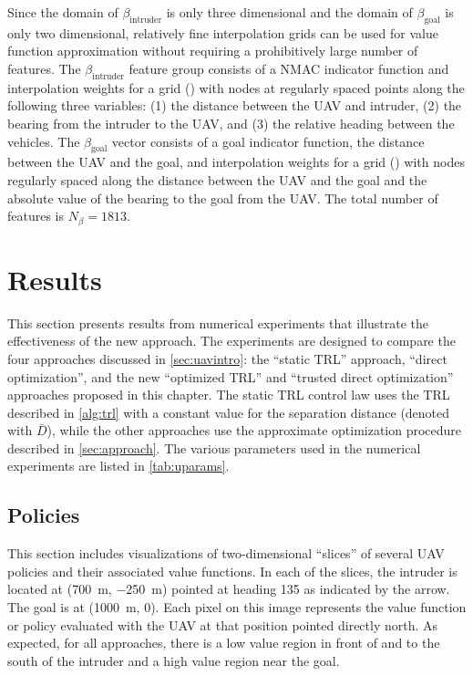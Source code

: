 Since the domain of $\beta_\text{intruder}$ is only three dimensional and the domain of $\beta_\text{goal}$ is only two dimensional, relatively fine interpolation grids can be used for value function approximation without requiring a prohibitively large number of features. The $\beta_\text{intruder}$ feature group consists of a NMAC indicator function and interpolation weights for a grid () with nodes at regularly spaced points along the following three variables: (1) the distance between the UAV and intruder, (2) the bearing from the intruder to the UAV, and (3) the relative heading between the vehicles. The $\beta_\text{goal}$ vector consists of a goal indicator function, the distance between the UAV and the goal, and interpolation weights for a grid () with nodes regularly spaced along the distance between the UAV and the goal and the absolute value of the bearing to the goal from the UAV. The total number of features is $N_\beta = 1813$.


\section{Results} \label{sec:results}

This section presents results from numerical experiments that illustrate the effectiveness of the new approach. The experiments are designed to compare the four approaches discussed in \cref{sec:uavintro}: the ``static TRL'' approach, ``direct optimization'', and the new ``optimized TRL'' and ``trusted direct optimization'' approaches proposed in this chapter. The static TRL control law uses the TRL described in \cref{alg:trl} with a constant value for the separation distance (denoted with $\bar{D}$), while the other approaches use the approximate optimization procedure described in \cref{sec:approach}. The various parameters used in the numerical experiments are listed in \cref{tab:uparams}.

\subsection{Policies}

This section includes visualizations of two-dimensional ``slices'' of several UAV policies and their associated value functions. In each of the slices, the intruder is located at (\SI{700}{m}, \SI{-250}{m}) pointed at heading 135 as indicated by the arrow. The goal is at (\SI{1000}{m}, \num{0}). Each pixel on this image represents the value function or policy evaluated with the UAV at that position pointed directly north. As expected, for all approaches, there is a low value region in front of and to the south of the intruder and a high value region near the goal.

